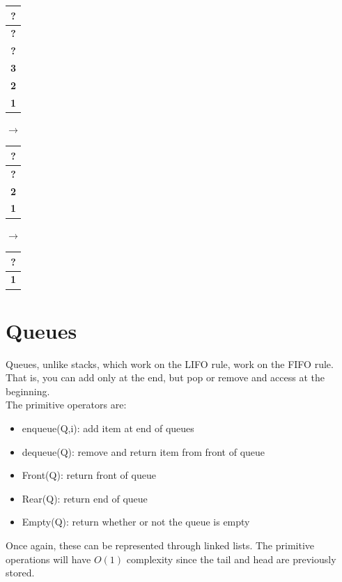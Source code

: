 \documentclass[nobib]{tufte-handout}
\begin{document}
\begin{table}
\begin{tabular}[b]{|c|}
        \hline
        \textbf{?} \\
        \hline
        \textbf{?} \\
        \hline
        \textbf{?} \\
        \hline
        \textbf{3} \\
        \hline
        \textbf{2} \\
        \hline
        \textbf{1} \\
        \hline
    \end{tabular}
    $\rightarrow$
    \begin{tabular}[b]{|c|}
        \hline
        \textbf{?} \\
        \hline
        \textbf{?} \\
        \hline
        \textbf{2} \\
        \hline
        \textbf{1} \\
        \hline
    \end{tabular}
    $\rightarrow$
    \begin{tabular}[b]{|c|}
        \hline
        \textbf{?} \\
        \hline
        \textbf{1} \\
        \hline
    \end{tabular}
\end{table}
\section{Queues}
Queues, unlike stacks, which work on the LIFO rule, work on the FIFO rule. That is, you can add only at the end, but pop or remove and access at the beginning.\\ 
The primitive operators are:
\begin{itemize}
    \item enqueue(Q,i): add item at end of queues
    \item dequeue(Q): remove and return item from front of queue
    \item Front(Q): return front of queue
    \item Rear(Q): return end of queue
    \item Empty(Q): return whether or not the queue is empty
\end{itemize}
Once again, these can be represented through linked lists. The primitive operations will have $O(1)$ complexity since the tail and head are previously stored.\\
\end{document}
